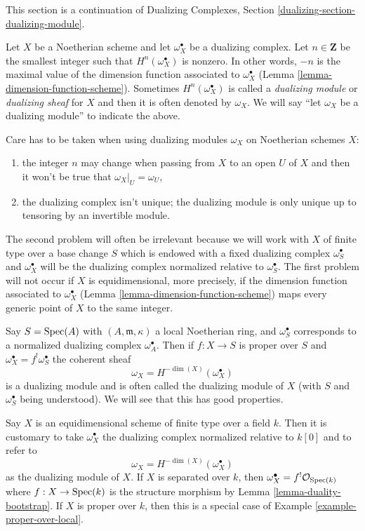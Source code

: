 \noindent
This section is a continuation of
Dualizing Complexes, Section \ref{dualizing-section-dualizing-module}.

\medskip\noindent
Let $X$ be a Noetherian scheme and let $\omega_X^\bullet$ be a
dualizing complex. Let $n \in \mathbf{Z}$ be the smallest integer such that
$H^n(\omega_X^\bullet)$ is nonzero. In other words, $-n$ is the maximal
value of the dimension function associated to $\omega_X^\bullet$
(Lemma \ref{lemma-dimension-function-scheme}).
Sometimes $H^n(\omega_X^\bullet)$
is called a {\it dualizing module} or {\it dualizing sheaf}
for $X$ and then it is often denoted
by $\omega_X$. We will say ``let $\omega_X$ be a dualizing module''
to indicate the above.

\medskip\noindent
Care has to be taken when using dualizing modules $\omega_X$ on Noetherian
schemes $X$:
\begin{enumerate}
\item the integer $n$ may change when passing from $X$ to an open $U$
of $X$ and then it won't be true that $\omega_X|_U = \omega_U$,
\item the dualizing complex isn't unique; the dualizing module
is only unique up to tensoring by an invertible module.
\end{enumerate}
The second problem will often be irrelevant because we will work
with $X$ of finite type over a base change $S$ which is
endowed with a fixed dualizing complex $\omega_S^\bullet$ and
$\omega_X^\bullet$ will be the dualizing complex normalized relative
to $\omega_S^\bullet$.
The first problem will not occur if $X$ is equidimensional, more precisely,
if the dimension function associated to $\omega_X^\bullet$
(Lemma \ref{lemma-dimension-function-scheme})
maps every generic point of $X$ to the same integer.

\begin{example}
\label{example-proper-over-local}
Say $S = \mathop{\mathrm{Spec}}(A)$ with $(A, \mathfrak m, \kappa)$
a local Noetherian ring, and $\omega_S^\bullet$ corresponds to
a normalized dualizing complex $\omega_A^\bullet$. Then if
$f : X \to S$ is proper over $S$ and $\omega_X^\bullet = f^!\omega_S^\bullet$
the coherent sheaf
$$
\omega_X = H^{-\dim(X)}(\omega_X^\bullet)
$$
is a dualizing module and is often called the dualizing module
of $X$ (with $S$ and $\omega_S^\bullet$ being understood). We will
see that this has good properties.
\end{example}

\begin{example}
\label{example-equidimensional-over-field}
Say $X$ is an equidimensional scheme of finite type
over a field $k$. Then it is customary to take
$\omega_X^\bullet$ the dualizing complex normalized relative to $k[0]$
and to refer to
$$
\omega_X = H^{-\dim(X)}(\omega_X^\bullet)
$$
as the dualizing module of $X$. If $X$ is separated over $k$, then
$\omega_X^\bullet = f^!\mathcal{O}_{\mathop{\mathrm{Spec}}(k)}$ where
$f : X \to \mathop{\mathrm{Spec}}(k)$ is the structure morphism by
Lemma \ref{lemma-duality-bootstrap}. If $X$ is proper over $k$, then
this is a special case of Example \ref{example-proper-over-local}.
\end{example}

